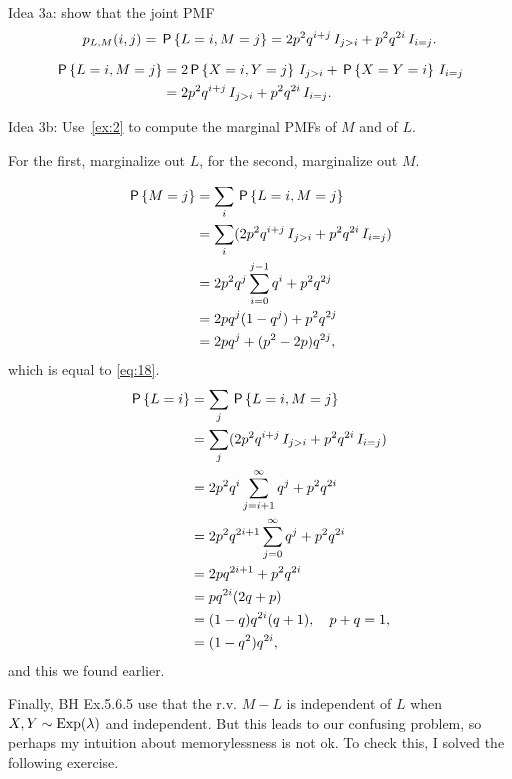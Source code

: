 \documentclass[a4paper,11pt]{article}
\begin{document}
\begin{exercise}\label{ex:2}
Idea 3a: show that  the  joint PMF
\begin{equation}
p_{L,M}(i,j) = \,\mathsf{P}\left\{L=i, M=j\right\} = 2p^{2}q^{i+j}\,I_{j>i}+ p^{2}q^{2i}\,I_{i=j}.
\end{equation}
\begin{solution}
  \begin{align}
    \label{eq:17}
\,\mathsf{P}\left\{L=i, M=j\right\}
&= 2\,\mathsf{P}\left\{X=i, Y=j\right\}\,I_{j>i} + \,\mathsf{P}\left\{X=Y=i\right\}\,I_{i=j} \\
&= 2p^{2}q^{i+j}\,I_{j>i}+ p^{2}q^{2i}\,I_{i=j}.
  \end{align}
\end{solution}
\end{exercise}

\begin{exercise}\label{ex:8}
Idea 3b: Use~\cref{ex:2} to compute the marginal PMFs of $M$ and of $L$.
\begin{hint}
For the first, marginalize out $L$, for the second, marginalize out $M$.
\end{hint}
\begin{solution}
  \begin{align}
\,\mathsf{P}\left\{M=j\right\}
&= \sum_{i} \,\mathsf{P}\left\{L=i, M=j\right\} \\
 &= \sum_{i} (2p^{2}q^{i+j}\,I_{j>i}+ p^{2}q^{2i}\,I_{i=j}) \\
 &= 2p^2q^j\sum_{i=0}^{j-1} q^{i}+ p^{2}q^{2j} \label{eq:38}\\
 &= 2pq^j (1-q^{j})+ p^{2}q^{2j} \\
 &= 2pq^j + (p^{2}-2p) q^{2j},
  \end{align}
which is equal to \cref{eq:18}.
  \begin{align}
\,\mathsf{P}\left\{L=i\right\}
&= \sum_{j} \,\mathsf{P}\left\{L=i, M=j\right\} \\
 &= \sum_{j} (2p^{2}q^{i+j}\,I_{j>i}+ p^{2}q^{2i}\,I_{i=j}) \\
 &= 2p^2q^i\sum_{j=i+1}^{\infty} q^{j}+ p^{2}q^{2i} \\
 &= 2p^{2}q^{2i+1} \sum_{j=0}^{\infty}q^{j}+ p^{2}q^{2i} \\
 &= 2pq^{2i+1} + p^{2} q^{2i}\\
 &= pq^{2i}(2q+p)\\
 &= (1-q)q^{2i}(q + 1), \quad p+q=1,\\
 &= (1-q^{2})q^{2i},
  \end{align}
and this we found earlier.
\end{solution}
\end{exercise}


Finally, BH Ex.5.6.5 use that the r.v.
$M-L$ is independent of $L$ when $X, Y\sim\mathrm{Exp}(\lambda)$ and independent.
But this leads to our confusing problem, so perhaps my intuition about memorylessness is not ok.
To check this, I solved  the following exercise.
\end{document}
